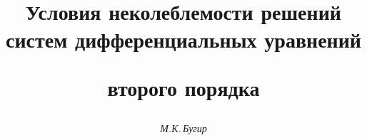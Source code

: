 

 




 


\newcommand{\ctg}{\operatorname{ctg}} 


\newcommand{\sgn}{\operatorname{sgn}} 


\newcommand{\tts}[1]{} 


 




 


\setcounter{page}{12} 












 


\author{\it М.К.\,Бугир} 




\title{Условия неколеблемости решений систем дифференциальных уравнений 


второго порядка} 


 


\date{} 




\pagestyle{plain} %


 




\maketitle 


